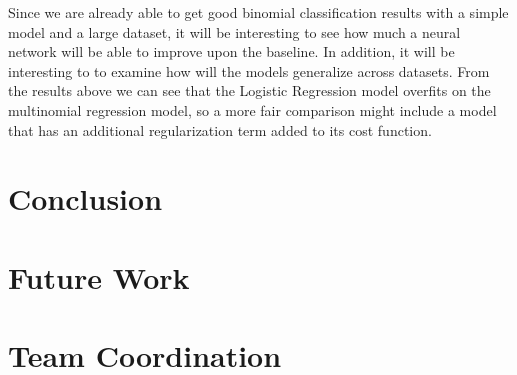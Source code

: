 \documentclass[conference]{IEEEtran}
\begin{document}
    Since we are already able to get good binomial classification results with a simple
    model and a large dataset, it will be interesting to see how much a neural network
    will be able to improve upon the baseline. In addition, it will be interesting to
    to examine how will the models generalize across datasets. From the results
    above we can see that the Logistic Regression model overfits on the multinomial
    regression model, so a more fair comparison might include a model that has
    an additional regularization term added to its cost function.
    
\section{Conclusion}
\label{conclusion}

\section{Future Work}
\label{future}

\section{Team Coordination}
\label{team}





\end{document}
